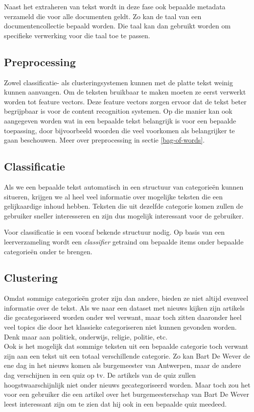 Naast het extraheren van tekst wordt in deze fase ook bepaalde metadata verzameld die voor alle documenten geldt. Zo kan de taal van een documentencollectie bepaald worden. Die taal kan dan gebruikt worden om specifieke verwerking voor die taal toe te passen. 

\subsection{Preprocessing}
Zowel classificatie- als clusteringsystemen kunnen met de platte tekst weinig kunnen aanvangen. Om de teksten bruikbaar te maken moeten ze eerst verwerkt worden tot feature vectors. Deze feature vectors zorgen ervoor dat de tekst beter begrijpbaar is voor de content recognition systemen. Op die manier kan ook aangegeven worden wat in een bepaalde tekst belangrijk is voor een bepaalde toepassing, door bijvoorbeeld woorden die veel voorkomen als belangrijker te gaan beschouwen. Meer over preprocessing in sectie \ref{bag-of-words}.

\subsection{Classificatie}
Als we een bepaalde tekst automatisch in een structuur van categorie\"en kunnen situeren, krijgen we al heel veel informatie over mogelijke teksten die een gelijkaardige inhoud hebben. Teksten die uit dezelfde categorie komen zullen de gebruiker sneller interesseren en zijn dus mogelijk interessant voor de gebruiker. 

Voor classificatie is een vooraf bekende structuur nodig. Op basis van een leerverzameling wordt een \textit{classifier} getraind om bepaalde items onder bepaalde categorie\"en onder te brengen.

\subsection{Clustering}
Omdat sommige categorie\"en groter zijn dan andere, bieden ze niet altijd evenveel informatie over de tekst. Als we naar een dataset met nieuws kijken zijn artikels die gecategoriseerd worden onder  wel verwant, maar toch zitten daaronder heel veel topics die door het klassieke categoriseren niet kunnen gevonden worden. Denk maar aan politiek, onderwijs, religie, politie, etc.
\\Ook is het mogelijk dat sommige teksten uit een bepaalde categorie toch verwant zijn aan een tekst uit een totaal verschillende categorie. Zo kan Bart De Wever de ene dag in het nieuws komen als burgemeester van Antwerpen, maar de andere dag verschijnen in een quiz op tv. De artikels van de quiz zullen hoogstwaarschijnlijk niet onder nieuws gecategoriseerd worden. Maar toch zou het voor een gebruiker die een artikel over het burgemeesterschap van Bart De Wever leest interessant zijn om te zien dat hij ook in een bepaalde quiz meedeed. 

